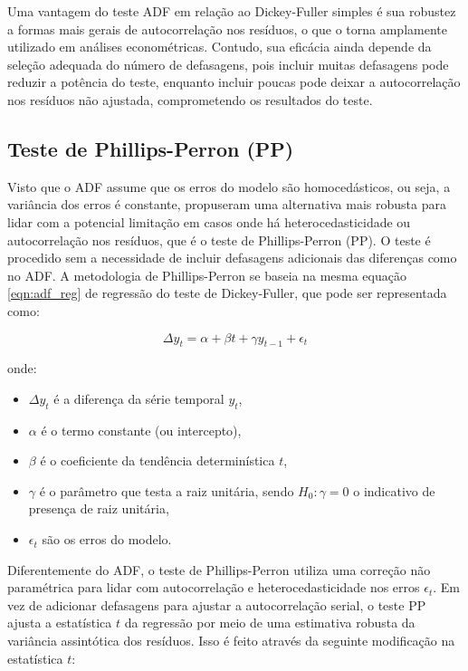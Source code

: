 \documentclass[12pt,oneside,a4paper,chapter=TITLE,english,brazil,sumario=abnt-6027-2012]{abntex2}
\begin{document}
Uma vantagem do teste ADF em relação ao Dickey-Fuller simples é sua robustez a formas mais gerais de autocorrelação nos resíduos, o que o torna amplamente utilizado em análises econométricas. Contudo, sua eficácia ainda depende da seleção adequada do número de defasagens, pois incluir muitas defasagens pode reduzir a potência do teste, enquanto incluir poucas pode deixar a autocorrelação nos resíduos não ajustada, comprometendo os resultados do teste.

\subsection{Teste de Phillips-Perron (PP)}

Visto que o ADF assume que os erros do modelo são homocedásticos, ou seja, a variância dos erros é constante,  propuseram uma alternativa mais robusta para lidar com a potencial limitação em casos onde há heterocedasticidade ou autocorrelação nos resíduos, que é o teste de Phillips-Perron (PP). O teste é procedido sem a necessidade de incluir defasagens adicionais das diferenças como no ADF. A metodologia de Phillips-Perron se baseia na mesma equação \ref{eqn:adf_reg} de regressão do teste de Dickey-Fuller, que pode ser representada como:

\begin{equation}
	\label{eqn:adf_reg}
	\Delta y_t = \alpha + \beta t + \gamma y_{t-1} + \epsilon_t
\end{equation}

onde:

\begin{itemize}
	\item \( \Delta y_t \) é a diferença da série temporal \( y_t \),
	\item \( \alpha \) é o termo constante (ou intercepto),
	\item \( \beta \) é o coeficiente da tendência determinística \( t \),
	\item \( \gamma \) é o parâmetro que testa a raiz unitária, sendo \( H_0: \gamma = 0 \) o indicativo de presença de raiz unitária,
	\item \( \epsilon_t \) são os erros do modelo.
\end{itemize}

Diferentemente do ADF, o teste de Phillips-Perron utiliza uma correção não paramétrica para lidar com autocorrelação e heterocedasticidade nos erros \( \epsilon_t \). Em vez de adicionar defasagens para ajustar a autocorrelação serial, o teste PP ajusta a estatística \( t \) da regressão por meio de uma estimativa robusta da variância assintótica dos resíduos. Isso é feito através da seguinte modificação na estatística \( t \):
\end{document}
